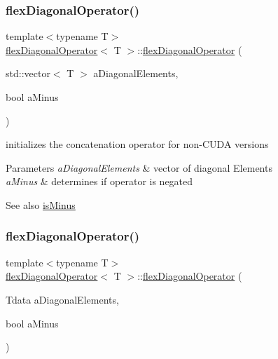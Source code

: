 \subsubsection{\texorpdfstring{flex\+Diagonal\+Operator()}{flexDiagonalOperator()}\hspace{0.1cm}{\footnotesize\ttfamily [1/2]}}
{\footnotesize\ttfamily template$<$typename T$>$ \\
\hyperlink{classflex_diagonal_operator}{flex\+Diagonal\+Operator}$<$ T $>$\+::\hyperlink{classflex_diagonal_operator}{flex\+Diagonal\+Operator} (\begin{DoxyParamCaption}\item[{std\+::vector$<$ T $>$}]{a\+Diagonal\+Elements,  }\item[{bool}]{a\+Minus }\end{DoxyParamCaption})\hspace{0.3cm}{\ttfamily [inline]}}



initializes the concatenation operator for non-\/\+C\+U\+DA versions 


\begin{DoxyParams}{Parameters}
{\em a\+Diagonal\+Elements} & vector of diagonal Elements \\
\hline
{\em a\+Minus} & determines if operator is negated \\
\hline
\end{DoxyParams}
\begin{DoxySeeAlso}{See also}
\hyperlink{classflex_linear_operator_a7f986517e10aee21099ec7692b77905d}{is\+Minus} 
\end{DoxySeeAlso}
\mbox{\label{classflex_diagonal_operator_a9e39335b75df3ac690aa3899f4a1a5e4}} 
\subsubsection{\texorpdfstring{flex\+Diagonal\+Operator()}{flexDiagonalOperator()}\hspace{0.1cm}{\footnotesize\ttfamily [2/2]}}
{\footnotesize\ttfamily template$<$typename T$>$ \\
\hyperlink{classflex_diagonal_operator}{flex\+Diagonal\+Operator}$<$ T $>$\+::\hyperlink{classflex_diagonal_operator}{flex\+Diagonal\+Operator} (\begin{DoxyParamCaption}\item[{Tdata}]{a\+Diagonal\+Elements,  }\item[{bool}]{a\+Minus }\end{DoxyParamCaption})\hspace{0.3cm}{\ttfamily [inline]}}



